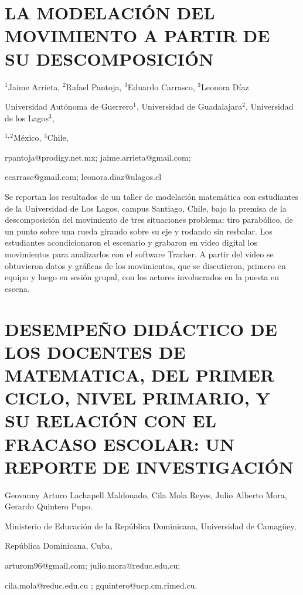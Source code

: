 \section{LA MODELACIÓN DEL MOVIMIENTO A PARTIR DE SU DESCOMPOSICIÓN}

\begin{datos}

$^{1}$Jaime Arrieta, $^{2}$Rafael Pantoja, $^{3}$Eduardo Carrasco,
$^{3}$Leonora Díaz 

Universidad Autónoma de Guerrero$^{1}$, Universidad de Guadalajara$^{2}$,
Universidad de los Lagos$^{3}$, 

$^{1,2}$México, $^{3}$Chile,

rpantoja@prodigy.net.mx; jaime.arrieta@gmail.com; 

ecarrasc@gmail.com; leonora.diaz@ulagos.cl 

\end{datos}

Se reportan los resultados de un taller de modelación matemática con
estudiantes de la Universidad de Los Lagos, campus Santiago, Chile,
bajo la premisa de la descomposición del movimiento de tres situaciones
problema: tiro parabólico, de un punto sobre una rueda girando sobre
su eje y rodando sin resbalar. Los estudiantes acondicionaron el escenario
y grabaron en video digital los movimientos para analizarlos con el
software Tracker. A partir del video se obtuvieron datos y gráficas
de los movimientos, que se discutieron, primero en equipo y luego
en sesión grupal, con los actores involucrados en la puesta en escena.


\section{DESEMPEÑO DIDÁCTICO DE LOS DOCENTES DE MATEMATICA, DEL PRIMER CICLO,
NIVEL PRIMARIO, Y SU RELACIÓN CON EL FRACASO ESCOLAR: UN REPORTE DE
INVESTIGACIÓN}

\begin{datos}

Geovanny Arturo Lachapell Maldonado, Cila Mola Reyes, Julio Alberto
Mora, Gerardo Quintero Pupo.

Ministerio de Educación de la República Dominicana, Universidad de
Camagüey,

República Dominicana, Cuba,

arturom96@gmail.com; julio.mora@reduc.edu.cu; 

cila.mola@reduc.edu.cu ; gquintero@ucp.cm.rimed.cu.

\end{datos}


